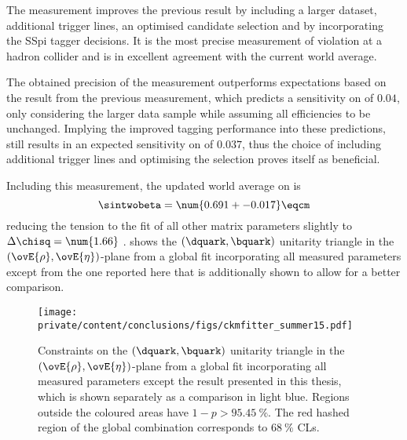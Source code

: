 The measurement improves the previous \LHCb result \cite{Aaij:1497268} by
including a larger dataset, additional trigger lines, an optimised candidate
selection and by incorporating the \acl{SSpi} tagger decisions. It is the most
precise measurement of \CP violation at a hadron collider and is in excellent
agreement with the current world average.

The obtained precision of the measurement outperforms expectations based on
the result from the previous measurement, which predicts a sensitivity on
\SJpsiKS of $\num{0.04}$, only considering the larger data sample while assuming
all efficiencies to be unchanged. Implying the improved tagging performance
into these predictions, still results in an expected sensitivity on \SJpsiKS of
$\num{0.037}$, thus the choice of including additional trigger lines and
optimising the selection proves itself as beneficial.

Including this measurement, the updated world average on \sintwobeta
\cite{Amhis:2014hma} is
%
\begin{equation*}
  \sintwobeta = \num{0.691 +- 0.017} \eqcm
\end{equation*}
%
reducing the tension to the fit of all other \CKM matrix parameters slightly to
$\Delta\chisq = \num{1.66}$ \cite{Charles:2004jd}. 
 shows the ${(\dquark,\bquark)}$ unitarity
triangle in the ${(\ovE{\rho},\ovE{\eta})}$-plane from a global fit
incorporating all measured \CKM parameters \cite{Charles:2004jd} except from the
one reported here that is additionally shown to allow for a better comparison.
%
\begin{figure}[ht]
\centering
\texttt{[image: private/content/conclusions/figs/ckmfitter\_summer15.pdf]}
\caption{Constraints on the ${(\dquark,\bquark)}$ unitarity triangle in the
${(\ovE{\rho},\ovE{\eta})}$-plane from a global fit incorporating all measured
\CKM parameters except the result presented in this thesis, which is shown
separately as a comparison in light blue. Regions outside the coloured areas
have $1-p > \SI{95.45}{\percent}$. The red hashed region of the global
combination corresponds to $\SI{68}{\percent}$ \acp{CL}. \cite{Charles:2004jd}}
\label{fig:conclusion:ckm_fitter_15}
\end{figure}

